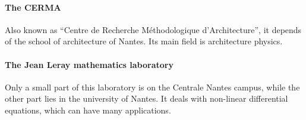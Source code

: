 \paragraph{The CERMA} Also known as “Centre de Recherche Méthodologique d'Architecture”, it depends of the school of architecture of Nantes. Its main field is architecture physics. %
\paragraph{The Jean Leray mathematics laboratory} Only a small part of this laboratory is on the Centrale Nantes campus, while the other part lies in the university of Nantes. It deals with non-linear differential equations, which can have many applications. %


